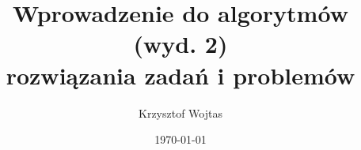 \title{Wprowadzenie do algorytmów (wyd. 2)\\rozwiązania zadań i problemów}
\author{Krzysztof Wojtas}
\date{\today}

\maketitle



